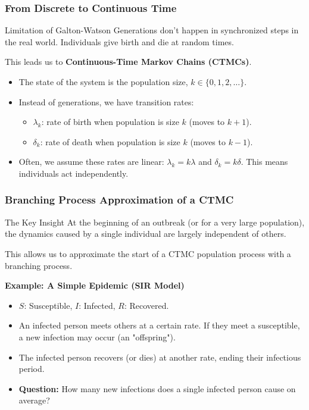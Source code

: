 \documentclass[aspectratio=169]{beamer}\usepackage[]{graphicx}\usepackage[]{xcolor}
\begin{document}
\begin{frame}
    \frametitle{From Discrete to Continuous Time}

    \begin{block}{Limitation of Galton-Watson}
        Generations don't happen in synchronized steps in the real world. Individuals give birth and die at random times.
    \end{block}

    This leads us to \textbf{Continuous-Time Markov Chains (CTMCs)}.

    \begin{itemize}
        \item The state of the system is the population size, $k \in \{0, 1, 2, \dots\}$.
        \item Instead of generations, we have transition rates:
            \begin{itemize}
                \item $\lambda_k$: rate of birth when population is size $k$ (moves to $k+1$).
                \item $\delta_k$: rate of death when population is size $k$ (moves to $k-1$).
            \end{itemize}
        \item Often, we assume these rates are linear: $\lambda_k = k\lambda$ and $\delta_k = k\delta$. This means individuals act independently.
    \end{itemize}
\end{frame}

\begin{frame}
    \frametitle{Branching Process Approximation of a CTMC}

    \begin{alertblock}{The Key Insight}
    At the beginning of an outbreak (or for a very large population), the dynamics caused by a single individual are largely independent of others.
    \end{alertblock}

    This allows us to approximate the start of a CTMC population process with a branching process.

    \textbf{Example: A Simple Epidemic (SIR Model)}
    \begin{itemize}
        \item $S$: Susceptible, $I$: Infected, $R$: Recovered.
        \item An infected person meets others at a certain rate. If they meet a susceptible, a new infection may occur (an "offspring").
        \item The infected person recovers (or dies) at another rate, ending their infectious period.
        \item \textbf{Question:} How many new infections does a single infected person cause on average?
    \end{itemize}
\end{frame}
\end{document}
